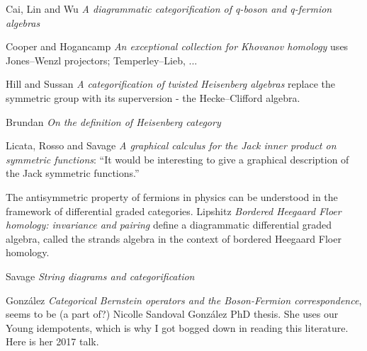 \begin{description}
Cai, Lin and Wu
{\em A diagrammatic categorification of q-boson and q-fermion algebras}

Cooper and Hogancamp
{\em An exceptional collection for {Khovanov} homology} uses
Jones–Wenzl projectors; Temperley–Lieb, ...

Hill and Sussan {\em A categorification of twisted
{Heisenberg} algebras}
replace the symmetric group with its superversion - the Hecke–Clifford
algebra.


Brundan {\em On the definition of {Heisenberg} category}

Licata, Rosso and Savage {\em A graphical calculus for the
{Jack} inner product on symmetric functions}: ``It would be interesting to
give a graphical description of the Jack symmetric functions.''

The antisymmetric property of fermions in physics can be understood in
the framework of differential graded categories.
Lipshitz \etal{} {\em Bordered Heegaard Floer homology:
invariance and pairing} define a diagrammatic differential graded
algebra, called the strands algebra in the context of bordered Heegaard
Floer homology.

Savage {\em String diagrams and categorification}

Gonz{\'a}lez {\em Categorical {Bernstein} operators and the
{Boson-Fermion} correspondence},  seems to be (a part of?)
{Nicolle Sandoval Gonz{\'a}lez} PhD thesis. She uses our Young idempotents,
which is why I got bogged down in reading this literature. Here is her
 {2017 talk}.


\end{description}


\printbibliography[heading=subbibintoc,title={References}]
